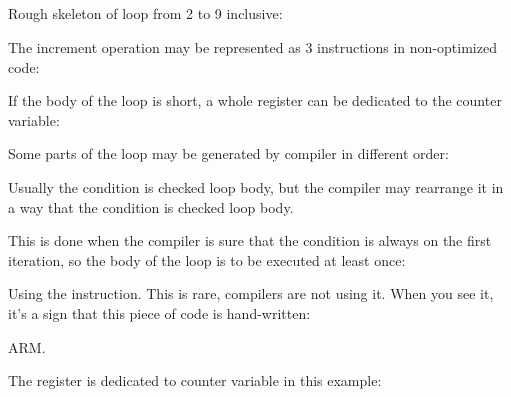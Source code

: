 ﻿%
\subsection{\Conclusion{}}

Rough skeleton of loop from 2 to 9 inclusive:



The increment operation may be represented as 3 instructions in non-optimized code:



If the body of the loop is short, a whole register can be dedicated to the counter variable:



Some parts of the loop may be generated by compiler in different order:



Usually the condition is checked  loop body, but the compiler may rearrange it in a way that
the condition is checked  loop body.

This is done when the compiler is sure that the condition is always  on the first iteration, 
so the body of the loop is to be executed at least once:




Using the  instruction. This is rare, compilers are not using it.
When you see it, it's a sign that this piece of code is hand-written:



ARM. 

The  register is dedicated to counter variable in this example:




